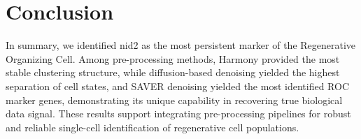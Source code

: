 \documentclass[11pt]{article}
\begin{document}
\section{Conclusion}
In summary, we identified nid2 as the most persistent marker of the Regenerative Organizing Cell.  Among pre-processing methods, Harmony provided the most stable clustering structure, while diffusion-based denoising yielded the highest separation of cell states, and SAVER denoising yielded the most identified ROC marker genes, demonstrating its unique capability in recovering true biological data signal. These results support integrating pre-processing pipelines for robust and reliable single-cell identification of regenerative cell populations.

\end{document}
